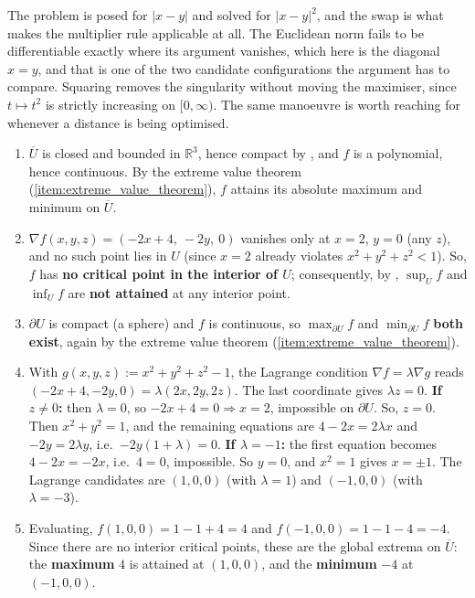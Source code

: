 \begin{remark}
The problem is posed for $|x-y|$ and solved for $|x-y|^2$, and the swap is what makes the
multiplier rule applicable at all. The Euclidean norm fails to be differentiable exactly where its
argument vanishes, which here is the diagonal $x=y$, and that is one of the two candidate
configurations the argument has to compare. Squaring removes the singularity without moving the
maximiser, since $t \mapsto t^2$ is strictly increasing on $[0,\infty)$. The same manoeuvre is
worth reaching for whenever a distance is being optimised.
\end{remark}

\begin{exercisesolution}
\label{sol:lagrange_ball_extrema}
\begin{enumerate}[label=\textbf{(\alph*)}]
  \item $\overline{U}$ is closed and bounded in $\mathbb{R}^3$, hence compact by
    , and $f$ is a polynomial, hence continuous. By the extreme value
    theorem (\cref{item:extreme_value_theorem}), $f$ attains its absolute maximum and minimum on
    $\overline{U}$.
  \item $\nabla f(x,y,z) = (-2x+4,\ -2y,\ 0)$ vanishes only at $x=2$, $y=0$ (any $z$), and no such
    point lies in $U$ (since $x=2$ already violates $x^2+y^2+z^2<1$). So, $f$ has \textbf{no
    critical point in the interior of $U$}; consequently, by
    , $\sup_U f$ and $\inf_U f$ are \textbf{not attained} at
    any interior point.
  \item $\partial U$ is compact (a sphere) and $f$ is continuous, so $\max_{\partial U} f$ and
    $\min_{\partial U} f$ \textbf{both exist}, again by the extreme value theorem
    (\cref{item:extreme_value_theorem}).
  \item With $g(x,y,z) := x^2+y^2+z^2-1$, the Lagrange condition $\nabla f = \lambda \nabla g$
    reads $(-2x+4,-2y,0) = \lambda(2x,2y,2z)$. The last coordinate gives $\lambda z = 0$.
    \textbf{If $z \neq 0$:} then $\lambda = 0$, so $-2x+4=0 \Rightarrow x=2$, impossible on
    $\partial U$. So, $z = 0$. Then $x^2+y^2=1$, and the remaining equations are
    $4-2x = 2\lambda x$ and $-2y = 2\lambda y$, i.e.\ $-2y(1+\lambda) = 0$.
    \textbf{If $\lambda = -1$:} the first equation becomes $4-2x=-2x$, i.e.\ $4=0$, impossible.
    So $y = 0$, and $x^2=1$ gives $x = \pm 1$. The Lagrange candidates are
    $(1,0,0)$ (with $\lambda = 1$) and $(-1,0,0)$ (with $\lambda = -3$).
  \item Evaluating, $f(1,0,0) = 1-1+4 = 4$ and $f(-1,0,0) = 1-1-4 = -4$. Since there are no
    interior critical points, these are the global extrema on $\overline{U}$: the
    \textbf{maximum} $4$ is attained at $(1,0,0)$, and the \textbf{minimum} $-4$ at $(-1,0,0)$.
\end{enumerate}
\end{exercisesolution}

